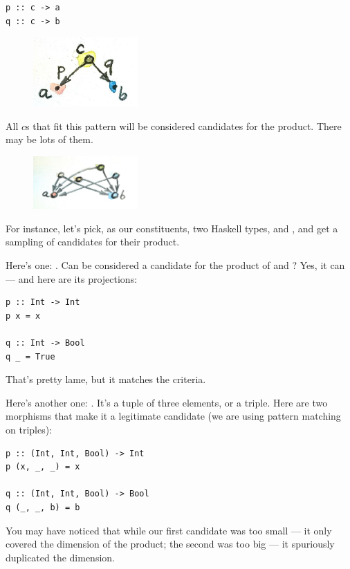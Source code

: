 \begin{Verbatim}
p :: c -> a
q :: c -> b
\end{Verbatim}

\begin{figure}[H]
\centering
\includegraphics[width=40mm]{images/productpattern.jpg}
\end{figure}

\noindent
All $c$s that fit this pattern will be considered candidates for
the product. There may be lots of them.

\begin{figure}[H]
\centering
\includegraphics[width=40mm]{images/productcandidates.jpg}
\end{figure}

\noindent
For instance, let's pick, as our constituents, two Haskell types,
 and , and get a sampling of candidates for
their product.

Here's one: . Can  be considered a candidate for
the product of  and ? Yes, it can --- and here
are its projections:

\begin{Verbatim}
p :: Int -> Int
p x = x

q :: Int -> Bool
q _ = True
\end{Verbatim}
That's pretty lame, but it matches the criteria.

Here's another one: . It's a tuple of three
elements, or a triple. Here are two morphisms that make it a legitimate
candidate (we are using pattern matching on triples):

\begin{Verbatim}
p :: (Int, Int, Bool) -> Int
p (x, _, _) = x

q :: (Int, Int, Bool) -> Bool
q (_, _, b) = b
\end{Verbatim}
You may have noticed that while our first candidate was too small --- it
only covered the  dimension of the product; the second was
too big --- it spuriously duplicated the  dimension.

